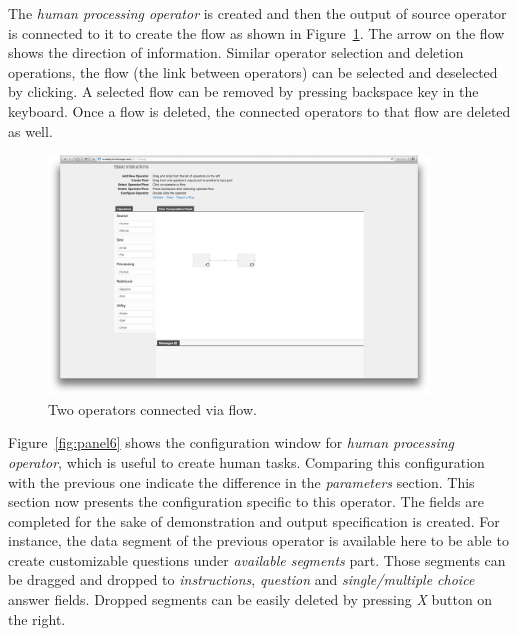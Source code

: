 The \textit{human processing operator} is created and then the output of source 
operator is connected to it to create the flow as shown in Figure~\ref{fig:panel5}. 
The arrow on the flow shows the direction of information. Similar operator 
selection and deletion operations, the flow (the link between operators) can 
be selected and deselected by clicking. A selected flow can be removed by 
pressing backspace key in the keyboard. Once a flow is deleted, the connected 
operators to that flow are deleted as well.

\begin{figure}[ht]
	\centering
	\includegraphics[width=0.9\textwidth]{figures/tool/panel5.png}
	\caption{Two operators connected via flow.}
	\label{fig:panel5}
\end{figure}

Figure~\ref{fig:panel6} shows the configuration window for 
\textit{human processing operator}, which is useful to create human tasks. 
Comparing this configuration with the previous 
one indicate the difference in the \textit{parameters} section. This section now presents 
the configuration specific to this operator. The fields are completed for the sake of 
demonstration and output specification is created. For instance, the data segment of 
the previous operator is available here to be able to create customizable questions 
under \textit{available segments} part. Those segments can be dragged and dropped 
to \textit{instructions}, \textit{question} and \textit{single/multiple choice} answer fields. 
Dropped segments can be easily deleted by pressing \textit{X} button on the right.

